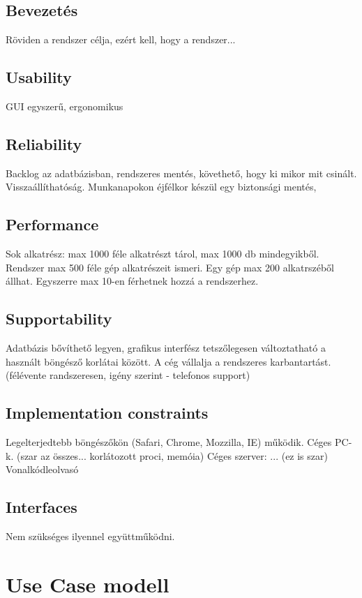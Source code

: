 \documentclass[11pt]{article}\usepackage[left=20mm,right=20mm,top=15mm,bottom=20mm]{geometry}
\begin{document}
\subsection{Bevezetés}
Röviden a rendszer célja, ezért kell, hogy a rendszer...

\subsection{Usability}
GUI egyszerű, ergonomikus

\subsection{Reliability}
Backlog az adatbázisban, rendszeres mentés, követhető, hogy
ki mikor mit csinált. Visszaállíthatóság. 
Munkanapokon éjfélkor készül egy biztonsági mentés,

\subsection{Performance}
Sok alkatrész: max 1000 féle alkatrészt tárol, max 1000 db mindegyikből. Rendszer max 500 féle gép alkatrészeit ismeri. Egy gép max 200 alkatrszéből állhat. Egyszerre max 10-en férhetnek hozzá a rendszerhez. 

\subsection{Supportability}
Adatbázis bővíthető legyen, grafikus interfész tetszőlegesen változtatható a használt böngésző korlátai között.
A cég vállalja a rendszeres karbantartást. (félévente randszeresen, igény szerint - telefonos support)

\subsection{Implementation constraints}
Legelterjedtebb böngészőkön (Safari, Chrome, Mozzilla, IE) működik.
Céges PC-k. (szar az összes... korlátozott proci, memóia) Céges szerver: ... (ez is szar)
Vonalkódleolvasó

\subsection{Interfaces}
Nem szükséges ilyennel együttműködni.

\section{Use Case modell}
\end{document}
